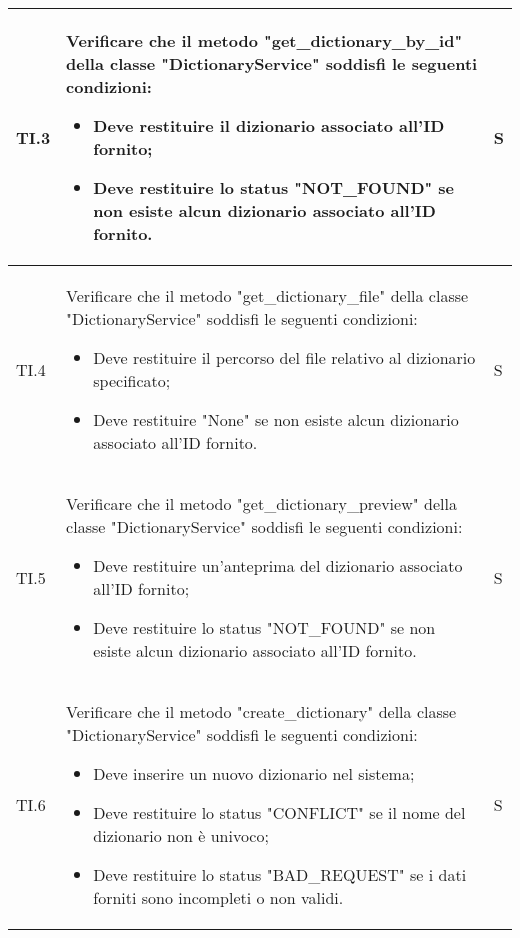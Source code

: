 \begin{adjustwidth}{-0.5cm}{-0.5cm}
\begin{longtable}{|P{1.5cm}|>{\raggedright}P{9.5cm}|>{\arraybackslash}P{1.5cm}|}
		\hline TI.3 & Verificare che il metodo "get\_dictionary\_by\_id" della classe "DictionaryService" soddisfi le seguenti condizioni:
		\begin{itemize}
			\item Deve restituire il dizionario associato all'ID fornito;
			\item Deve restituire lo status "NOT\_FOUND" se non esiste alcun dizionario associato all'ID fornito.
		\end{itemize} & S \\

		\hline TI.4 & Verificare che il metodo "get\_dictionary\_file" della classe "DictionaryService" soddisfi le seguenti condizioni:
		\begin{itemize}
			\item Deve restituire il percorso del file relativo al dizionario specificato;
			\item Deve restituire "None" se non esiste alcun dizionario associato all'ID fornito.
		\end{itemize} & S \\

		\hline TI.5 & Verificare che il metodo "get\_dictionary\_preview" della classe "DictionaryService" soddisfi le seguenti condizioni:
		\begin{itemize}
			\item Deve restituire un'anteprima del dizionario associato all'ID fornito;
			\item Deve restituire lo status "NOT\_FOUND" se non esiste alcun dizionario associato all'ID fornito.
		\end{itemize} & S \\

		\hline TI.6 & Verificare che il metodo "create\_dictionary" della classe "DictionaryService" soddisfi le seguenti condizioni:
		\begin{itemize}
			\item Deve inserire un nuovo dizionario nel sistema;
			\item Deve restituire lo status "CONFLICT" se il nome del dizionario non è univoco;
			\item Deve restituire lo status "BAD\_REQUEST" se i dati forniti sono incompleti o non validi.
		\end{itemize} & S \\


\end{longtable}
\end{adjustwidth}

